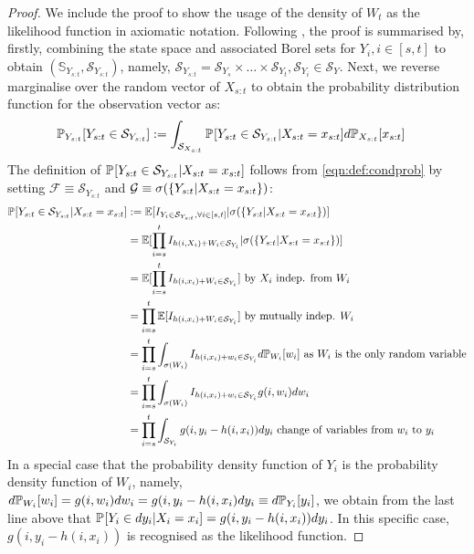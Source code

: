 \begin{lemma}
\begin{proof} We include the proof to show the usage of the density of $W_t$ as the likelihood function in axiomatic notation. Following \cite{bain2009}, the proof is summarised by, firstly, combining the state space and associated Borel sets for $Y_i, i \in [s, t]$ to obtain $(\mathbb{S}_{Y_{s:t}}, \mathcal{S}_{Y_{s:t}})$, namely, $\mathcal{S}_{Y_{s:t}} = \mathcal{S}_{Y_s} \times \hdots \times \mathcal{S}_{Y_t},  \mathcal{S}_{Y_i} \in \mathcal{S}_Y$.  Next, we reverse marginalise over the random vector of $X_{s:t}$ to obtain the probability distribution function for the observation vector as:
\begin{align}
\mathbb{P}_{Y_{s:t}}{[Y_{s:t} \in \mathcal{S}_{Y_{s:t}}]} &:= \int_{\mathcal{S}_{X_{s:t}}} \mathbb{P}_{{}}{[Y_{s:t} \in \mathcal{S}_{Y_{s:t}} | X_{s:t} = x_{s:t}]} d\mathbb{P}_{X_{s:t}}{[x_{s:t}]} 
\end{align} The definition of $\mathbb{P}_{{}}{[Y_{s:t} \in \mathcal{S}_{Y_{s:t}} | X_{s:t} = x_{s:t}]}$ follows from \cref{eqn:def:condprob} by setting $\mathcal{F} \equiv \mathcal{S}_{Y_{s:t}}$ and $\mathcal{G} \equiv \sigma(\{Y_{s:t} | X_{s:t} = x_{s:t}\})$:
\begin{align}
\mathbb{P}_{{}}{[Y_{s:t} \in \mathcal{S}_{Y_{s:t}} | X_{s:t} = x_{s:t}]} &: = \mathbb{E}[ I_{Y_i \in \mathcal{S}_{Y_{s:t}}, \forall i \in [s,t]}| \sigma(\{Y_{s:t} | X_{s:t} = x_{s:t}\}) ] \\
& = \mathbb{E}[ \prod_{i=s}^t I_{h(i, X_i) + W_i \in \mathcal{S}_{Y_{i}}}| \sigma(\{Y_{s:t} | X_{s:t} = x_{s:t}\}) ] \\
& = \mathbb{E}[ \prod_{i=s}^t I_{h(i, x_i) + W_i \in \mathcal{S}_{Y_{i}}}] \text{ by $X_i$ indep. from $W_i$} \\
& = \prod_{i=s}^t \mathbb{E}[  I_{h(i, x_i) + W_i \in \mathcal{S}_{Y_i}}]  \text{ by mutually indep. $W_i$}\\
& = \prod_{i=s}^t \int_{ \sigma(W_i)} I_{h(i, x_i) + w_i \in \mathcal{S}_{Y_i}} d\mathbb{P}_{W_{i}}{[ w_{i}]} \text{ as $W_i$ is the only random variable}\\
& = \prod_{i=s}^t \int_{ \sigma(W_i)} I_{h(i, x_i) + w_i \in \mathcal{S}_{Y_i}} g(i, w_i) dw_{i} \\
& = \prod_{i=s}^t \int_{ \mathcal{S}_{Y_i}} g(i, y_i - h(i, x_i))  dy_i \text{ change of variables from $w_i$ to $y_i$}
\end{align}
In a special case that the probability density function of $Y_i$ is the probability density function of $W_i$, namely, $ d\mathbb{P}_{W_{i}}{[w_i]} = g(i, w_i) dw_i = g(i, y_i - h(i, x_i ) dy_i \equiv d\mathbb{P}_{Y_{i}}{[y_i]}$, we obtain from the last line above that $\mathbb{P}_{{}}{[Y_{i} \in dy_i | X_{i} = x_{i}]} = g(i, y_i - h(i, x_i )) dy_i$.  In this specific case, $g(i, y_i - h(i, x_i ))$ is recognised as the likelihood function. 


\end{proof}
\end{lemma}
